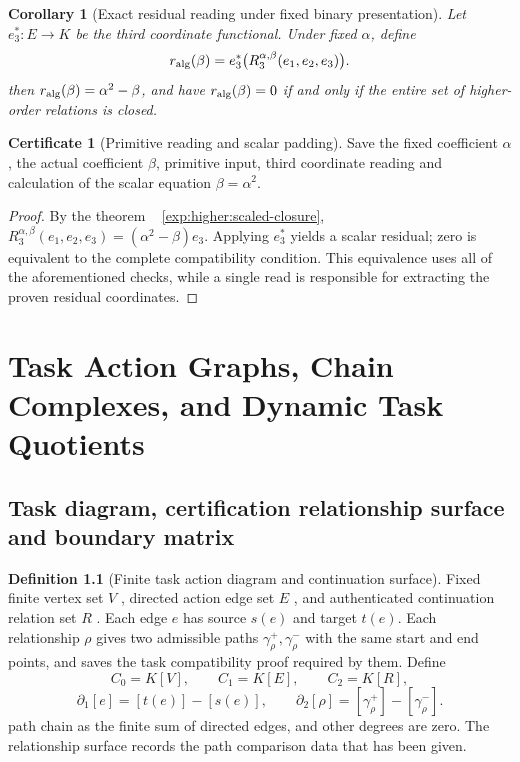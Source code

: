 \documentclass[12pt,a4paper,openany,notitlepage]{report}
\theoremstyle{plain}
\newtheorem{corollary}[theorem]{Corollary}
\theoremstyle{definition}
\newtheorem{definition}[theorem]{Definition}
\newtheorem*{certificate}{Certificate}
\theoremstyle{remark}
\def\mathcal#1{#1}\def\mathsf#1{#1}\def\mathbb#1{#1}%
\begin{document}
\begin{CJK*}
\begin{corollary}
[Exact residual reading under fixed binary presentation]\label{exp:higher:residual-readout}
Let $e_3^*:E\to\mathbb K$ be the third coordinate functional. Under fixed $\alpha$, define \[
 r_{\rm alg}(\beta)
 =e_3^*\bigl(\mathcal R_3^{\alpha,\beta}(e_1,e_2,e_3)\bigr).
\] then $r_{\rm alg}(\beta)=\alpha^2-\beta$, and have $r_{\rm alg}(\beta)=0$ if and only if the entire set of higher-order relations is closed.\end{corollary}
\begin{certificate}
[Primitive reading and scalar padding]Save the fixed coefficient $\alpha$, the actual coefficient $\beta$, primitive input, third coordinate reading and calculation of the scalar equation $\beta=\alpha^2$.\end{certificate}
\begin{proof}
By the theorem ~ \ref{exp:higher:scaled-closure}, $\mathcal R_3^{\alpha,\beta}(e_1,e_2,e_3)=(\alpha^2-\beta)e_3$. Applying $e_3^*$ yields a scalar residual; zero is equivalent to the complete compatibility condition. This equivalence uses all of the aforementioned checks, while a single read is responsible for extracting the proven residual coordinates.\end{proof}


\chapter{Task Action Graphs, Chain Complexes, and Dynamic Task Quotients}
\label{exp:ch:task}


\label{hgov:sec:taskcomplex}

\section { Task diagram, certification relationship surface and boundary matrix }

\begin{definition}
[Finite task action diagram and continuation surface]\label{hgov:def:taskcomplex}
Fixed finite vertex set $V$ , directed action edge set $E$ , and authenticated continuation relation set $R$ . Each edge $e$ has source $s(e)$ and target $t(e)$. Each relationship $\rho$ gives two admissible paths $\gamma_\rho^+,\gamma_\rho^-$ with the same start and end points, and saves the task compatibility proof required by them. Define \[
C_0=\mathbb K[V],\qquad C_1=\mathbb K[E],\qquad C_2=\mathbb K[R],
\] \[
\partial_1[e]=[t(e)]-[s(e)],\qquad
\partial_2[\rho]=[\gamma_\rho^+]-[\gamma_\rho^-].
\] path chain as the finite sum of directed edges, and other degrees are zero. The relationship surface records the path comparison data that has been given.\end{definition}



\end{CJK*}
\end{document}
